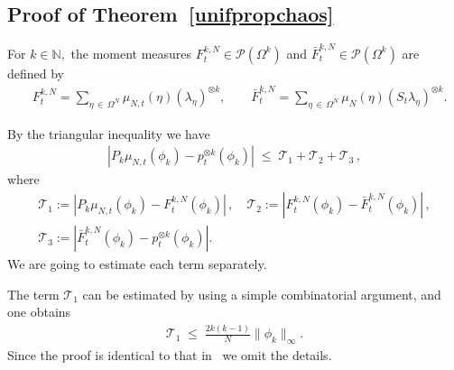 \documentclass[AHL,Unicode,longabstracts,published]{cedram}
\renewcommand{\leq}{\;\leqslant\;}
\newcommand{\Om}{\Omega}
\newcommand{\cP}{\mathcal{P}}
\newcommand{\cT}{\mathcal{T}}
\newcommand{\bbN}{\mathbb{N}}
\let\O=\Omega
\begin{document}
\subsection{Proof of Theorem~\ref{unifpropchaos}}

For $k \in \bbN,$ the moment measures $F_t^{k,N}\in\cP(\O^k)$ and $\bar{F}_t^{k,N}\in\cP(\O^k)$ are defined by
\begin{align}
&F_t^{k,N} =\sum_{\eta\,\in\,\Om^N}
\mu_{N,t}(\eta)(\lambda_{\eta})^{\otimes k}, \qquad
\bar F_t^{k,N} = \sum_{\eta\,\in\,\Om^N}
\mu_{N}(\eta)(S_t\lambda_{\eta})^{\otimes k}.
\end{align}

By the triangular inequality we have
\begin{align}\label{labo}
\left|P_k\mu_{N,t}(\phi_k)-p_t^{\otimes k}(\phi_k)\right|\leq \cT_1 + \cT_2 + \cT_3\,,
\end{align}
where
\begin{equation}\label{labt}
\begin{gathered}
\cT_1:=\left|P_k\mu_{N,t}(\phi_k)-F_t^{k,N}(\phi_k)\right| \,,\quad\cT_2:= \left|F_t^{k,N}(\phi_k)-\bar{F}_t^{k,N}(\phi_k)\right|\,,\\
\cT_3:= \left|\bar{F}_t^{k,N}(\phi_k)-p_t^{\otimes k}(\phi_k)\right|.
\end{gathered}
\end{equation}
We are going to estimate each term separately.

The term $\cT_1$ can be estimated by using a simple combinatorial argument, and one obtains
\begin{align}\label{labt1}
\cT_1 \leq \frac{2k(k-1)}{N}\|\phi_k\|_{\infty}.
\end{align}
Since the proof is identical to that in~\cite[Lemma~3.11]{revchaos} we omit the details.
\end{document}
